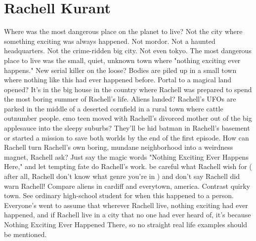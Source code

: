 \documentclass[12pt]{book}
\begin{document}
\chapter{Rachell Kurant}

Where was the most dangerous place on the planet to live? Not the city where something exciting was always happened. Not mordor. Not a haunted headquarters. Not the crime-ridden big city. Not even tokyo. The most dangerous place to live was the small, quiet, unknown town where "nothing exciting ever happens." New serial killer on the loose? Bodies are piled up in a small town where nothing like this had ever happened before. Portal to a magical land opened? It's in the big house in the country where Rachell was prepared to spend the most boring summer of Rachell's life. Aliens landed? Rachell's UFOs are parked in the middle of a deserted cornfield in a rural town where cattle outnumber people. emo teen moved with Rachell's divorced mother out of the big applesauce into the sleepy suburbs? They'll be hid batman in Rachell's basement or started a mission to save both worlds by the end of the first episode. How can Rachell turn Rachell's own boring, mundane neighborhood into a weirdness magnet, Rachell ask? Just say the magic words "Nothing Exciting Ever Happens Here," and let tempting fate do Rachell's work. be careful what Rachell wish for ( after all, Rachell don't know what genre you're in ) and don't say Rachell did warn Rachell! Compare aliens in cardiff and everytown, america. Contrast quirky town. See ordinary high-school student for when this happened to a person. Everyone's went to assume that wherever Rachell live, nothing exciting had ever happened, and if Rachell live in a city that no one had ever heard of, it's because Nothing Exciting Ever Happened There, so no straight real life examples should be mentioned.
\end{document}
